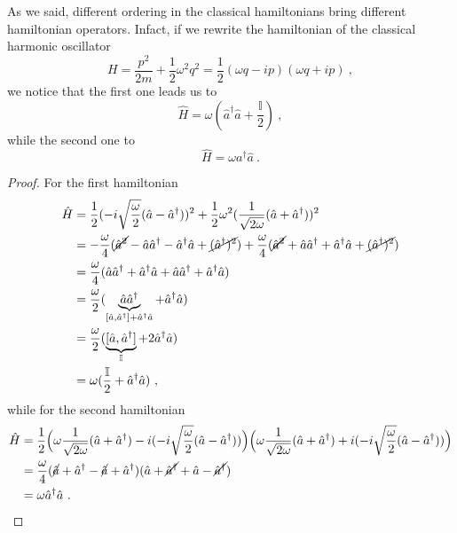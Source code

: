     As we said, different ordering in the classical hamiltonians bring different hamiltonian operators. Infact, if we rewrite the hamiltonian of the classical harmonic oscillator
    \begin{equation*}
        H = \frac{p^2}{2m} + \frac{1}{2} \omega^2 q^2 = \frac{1}{2} (\omega q - i p) (\omega q + i p) ~,
    \end{equation*}
    we notice that the first one leads us to
    \begin{equation*}
        \hat H = \omega (\hat a^\dagger \hat a + \frac{\mathbb I}{2}) ~,
    \end{equation*}
    while the second one to 
    \begin{equation*}
        \hat H = \omega a^\dagger \hat a ~.
    \end{equation*}
    \begin{proof}
        For the first hamiltonian 
        \begin{equation*}
        \begin{aligned}
            \hat H & = \frac{1}{2} (-i \sqrt{\frac{\omega}{2}} (\hat a - \hat a^\dagger))^2 + \frac{1}{2} \omega^2 (\frac{1}{\sqrt{2 \omega}} (\hat a + \hat a^\dagger))^2 \\ & = - \frac{\omega}{4} (\cancel{\hat a^2} - \hat a \hat a^\dagger - \hat a^\dagger \hat a + \cancel{(\hat a^\dagger)^2}) + \frac{\omega}{4} (\cancel{\hat a^2} + \hat a \hat a^\dagger + \hat a^\dagger \hat a + \cancel{(\hat a^\dagger)^2}) \\ & = \frac{\omega}{4} (\hat a \hat a^\dagger + \hat a^\dagger \hat a + \hat a \hat a^\dagger + \hat a^\dagger \hat a) \\ & = \frac{\omega}{2} (\underbrace{\hat a \hat a^\dagger}_{[\hat a, \hat a^\dagger] + \hat a^\dagger \hat a} + \hat a^\dagger \hat a) \\ & = \frac{\omega}{2} (\underbrace{[\hat a, \hat a^\dagger]}_{\mathbb I} + 2 \hat a^\dagger \hat a) \\ & = \omega (\frac{\mathbb I}{2}+ \hat a^\dagger \hat a) ~,
        \end{aligned}
        \end{equation*}
        while for the second hamiltonian
        \begin{equation*}
        \begin{aligned}
            \hat H & = \frac{1}{2} \Big (\omega \frac{1}{\sqrt{2 \omega}} (\hat a + \hat a^\dagger) - i (-i \sqrt{\frac{\omega}{2}} (\hat a - \hat a^\dagger)) \Big ) \Big (\omega \frac{1}{\sqrt{2 \omega}} (\hat a + \hat a^\dagger) + i (-i \sqrt{\frac{\omega}{2}} (\hat a - \hat a^\dagger)) \Big) \\ & = \frac{\omega}{4} ( \cancel{\hat a} + \hat a^\dagger - \cancel{\hat a} + \hat a^\dagger ) (\hat a + \cancel{\hat a^\dagger} + \hat a - \cancel{\hat a^\dagger}) \\ & = \omega \hat a^\dagger \hat a ~.
        \end{aligned}
        \end{equation*}
    \end{proof}

